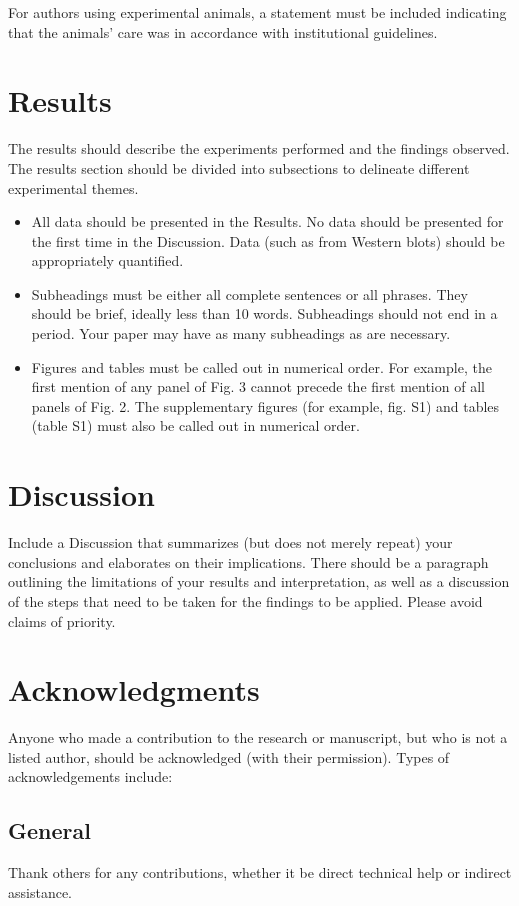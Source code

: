 \documentclass{article}
\begin{document}
For authors using experimental animals, a statement must be included indicating that the animals’ care was in accordance with institutional guidelines.

\section{Results}
The results should describe the experiments performed and the findings observed. The results section should be divided into subsections to delineate different experimental themes. 
\begin{itemize}
    \item All data should be presented in the Results. No data should be presented for the first time in the Discussion. Data (such as from Western blots) should be appropriately quantified.
    \item Subheadings must be either all complete sentences or all phrases. They should be brief, ideally less than 10 words. Subheadings should not end in a period. Your paper may have as many subheadings as are necessary.
    \item Figures and tables must be called out in numerical order. For example, the first mention of any panel of Fig. 3 cannot precede the first mention of all panels of Fig. 2. The supplementary figures (for example, fig. S1) and tables (table S1) must also be called out in numerical order. 
\end{itemize}

\section{Discussion}
Include a Discussion that summarizes (but does not merely repeat) your conclusions and elaborates on their implications. There should be a paragraph outlining the limitations of your results and interpretation, as well as a discussion of the steps that need to be taken for the findings to be applied. Please avoid claims of priority. 

\section*{Acknowledgments}
Anyone who made a contribution to the research or manuscript, but who is not a listed author, should be acknowledged (with their permission). Types of acknowledgements include:

\subsection*{General} 
Thank others for any contributions, whether it be direct technical help or indirect assistance. 
\end{document}
